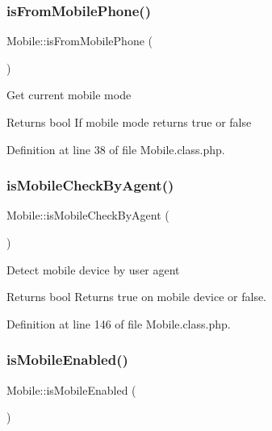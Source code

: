 \subsubsection{\texorpdfstring{is\+From\+Mobile\+Phone()}{isFromMobilePhone()}}
{\footnotesize\ttfamily Mobile\+::is\+From\+Mobile\+Phone (\begin{DoxyParamCaption}{ }\end{DoxyParamCaption})}

Get current mobile mode

\begin{DoxyReturn}{Returns}
bool If mobile mode returns true or false 
\end{DoxyReturn}


Definition at line 38 of file Mobile.\+class.\+php.

\hypertarget{classMobile_a58dde3c19008fb6fff64140c0b34a5ee}{}\label{classMobile_a58dde3c19008fb6fff64140c0b34a5ee} 
\subsubsection{\texorpdfstring{is\+Mobile\+Check\+By\+Agent()}{isMobileCheckByAgent()}}
{\footnotesize\ttfamily Mobile\+::is\+Mobile\+Check\+By\+Agent (\begin{DoxyParamCaption}{ }\end{DoxyParamCaption})}

Detect mobile device by user agent

\begin{DoxyReturn}{Returns}
bool Returns true on mobile device or false. 
\end{DoxyReturn}


Definition at line 146 of file Mobile.\+class.\+php.

\hypertarget{classMobile_aadc14b13b20ae9dc9b4dd96a45e04a3d}{}\label{classMobile_aadc14b13b20ae9dc9b4dd96a45e04a3d} 
\subsubsection{\texorpdfstring{is\+Mobile\+Enabled()}{isMobileEnabled()}}
{\footnotesize\ttfamily Mobile\+::is\+Mobile\+Enabled (\begin{DoxyParamCaption}{ }\end{DoxyParamCaption})}



